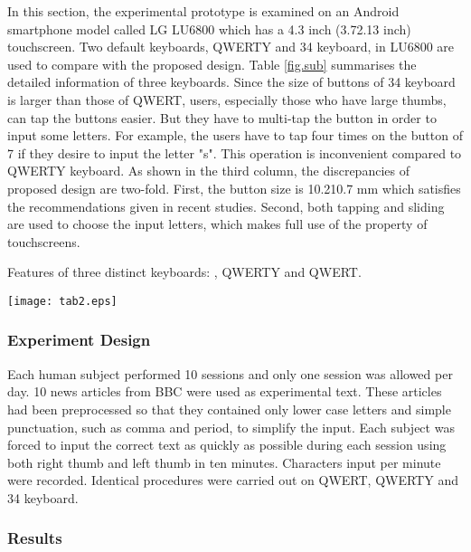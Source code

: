 \documentclass{singlecol-new}
\theoremstyle{TH}{
\newtheorem{lemma}{Lemma}
\newtheorem{theorem}[lemma]{Theorem}
\newtheorem{corrolary}[lemma]{Corrolary}
\newtheorem{conjecture}[lemma]{Conjecture}
\newtheorem{proposition}[lemma]{Proposition}
\newtheorem{claim}[lemma]{Claim}
\newtheorem{stheorem}[lemma]{Wrong Theorem}
\newtheorem{algorithm}{Algorithm}
}
\theoremstyle{THrm}{
\newtheorem{definition}{Definition}[section]
\newtheorem{question}{Question}[section]
\newtheorem{remark}{Remark}
\newtheorem{scheme}{Scheme}
}
\theoremstyle{THhit}{
\newtheorem{case}{Case}[section]
}
\begin{document}
In this section, the experimental prototype is examined on an Android smartphone model called LG LU6800 which has a 4.3 inch (3.72.13 inch) touchscreen. Two default keyboards, QWERTY and 34 keyboard, in LU6800 are used to compare with the proposed design. Table \ref{fig.sub} summarises the detailed information of three keyboards. Since the size of buttons of 34 keyboard is larger than those of QWERT, users, especially those who have large thumbs, can tap the buttons easier. But they have to multi-tap the button in order to input some letters. For example, the users have to tap four times on the button of 7 if they desire to input the letter "s". This operation is inconvenient compared to QWERTY keyboard. As shown in the third column, the discrepancies of proposed design are two-fold. First, the button size is 10.210.7 mm which satisfies the recommendations given in recent studies. Second, both tapping and sliding are used to choose the input letters, which makes full use of the property of touchscreens. \\

\begin{sidewaystable}
\centering
\caption{Features of three distinct keyboards: , QWERTY and QWERT.}\label{fig.sub}
  \texttt{[image: tab2.eps]}
\end{sidewaystable}


\subsubsection{Experiment Design}

Each human subject performed 10 sessions and only one session was allowed per day. 10 news articles from BBC were used as experimental text. These articles had been preprocessed so that they contained only lower case letters and simple punctuation, such as comma and period, to simplify the input. Each subject was forced to input the correct text as quickly as possible during each session using both right thumb and left thumb in ten minutes. Characters input per minute were recorded. Identical procedures were carried out on QWERT, QWERTY and 34 keyboard. \\

\subsubsection{Results}
\end{document}
